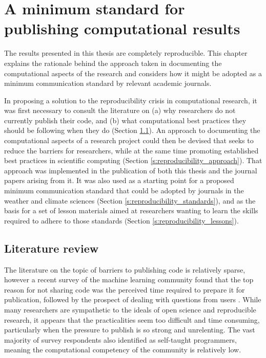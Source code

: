 
\chapter{A minimum standard for publishing computational results}\label{c:reproducibility}


\begin{synopsis}

The results presented in this thesis are completely reproducible. This chapter explains the rationale behind the approach taken in documenting the computational aspects of the research and considers how it might be adopted as a minimum communication standard by relevant academic journals.

\end{synopsis}



In proposing a solution to the reproducibility crisis in computational research, it was first necessary to consult the literature on (a) why researchers do not currently publish their code, and (b) what computational best practices they should be following when they do (Section \ref{s:reproducibility_review}). An approach to documenting the computational aspects of a research project could then be devised that seeks to reduce the barriers for researchers, while at the same time promoting established best practices in scientific computing (Section \ref{s:reproducibility_approach}). That approach was implemented in the publication of both this thesis and the journal papers arising from it. It was also used as a starting point for a proposed minimum communication standard that could be adopted by journals in the weather and climate sciences (Section \ref{s:reproducibility_standards}), and as the basis for a set of lesson materials aimed at researchers wanting to learn the skills required to adhere to those standards (Section \ref{s:reproducibility_lessons}). 



\section{Literature review}\label{s:reproducibility_review}

The literature on the topic of barriers to publishing code is relatively sparse, however a recent survey of the machine learning community found that the top reason for not sharing code was the perceived time required to prepare it for publication, followed by the prospect of dealing with questions from users \citep{Stodden2010}. While many researchers are sympathetic to the ideals of open science and reproducible research, it appears that the practicalities seem too difficult and time consuming, particularly when the pressure to publish is so strong and unrelenting. The vast majority of survey respondents also identified as self-taught programmers, meaning the computational competency of the community is relatively low. 

